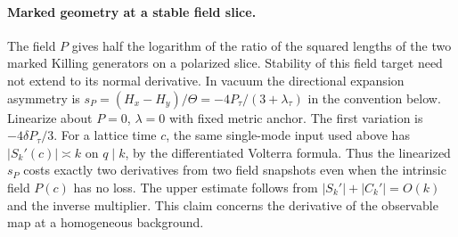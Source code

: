 \documentclass[11pt]{article}
\begin{document}
\paragraph{Marked geometry at a stable field slice.}
The field $P$ gives half the logarithm of the ratio of the squared
lengths of the two marked Killing generators on a polarized slice.
Stability of this field target need not extend to its normal
derivative. In vacuum the directional expansion asymmetry is
$s_P=(H_x-H_y)/\Theta=-4P_\tau/(3+\lambda_\tau)$ in the convention
below. Linearize about $P=0$, $\lambda=0$ with fixed metric anchor.
The first variation is $-4\delta P_\tau/3$.
For a lattice time $c$, the same single-mode input used above has
$|S_k'(c)|\asymp k$ on $q\mid k$, by the differentiated Volterra
formula. Thus the linearized $s_P$ costs exactly two derivatives from
two field snapshots even when the intrinsic field $P(c)$ has no loss.
The upper estimate follows from $|S_k'|+|C_k'|=O(k)$ and the inverse
multiplier. This claim concerns the derivative of the observable map
at a homogeneous background.
\end{document}
